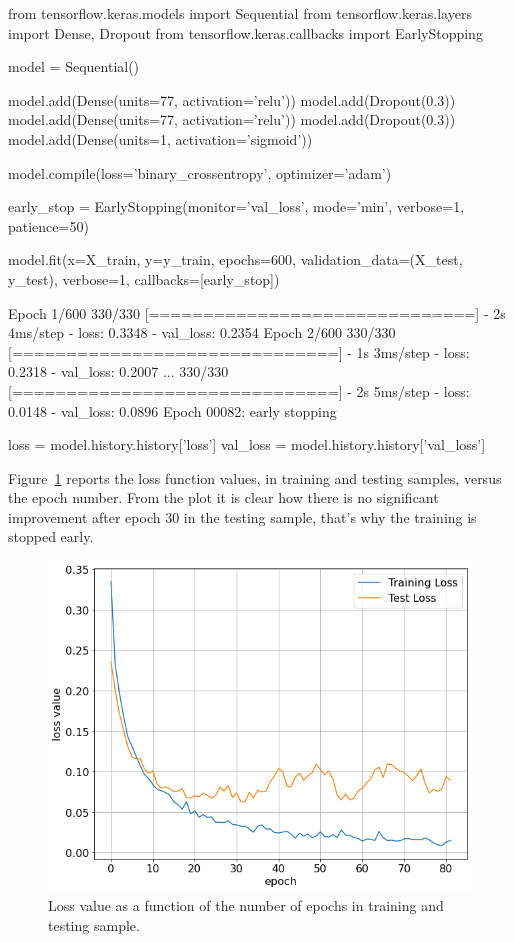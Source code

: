 \begin{ipython}
from tensorflow.keras.models import Sequential
from tensorflow.keras.layers import Dense, Dropout
from tensorflow.keras.callbacks import EarlyStopping

model = Sequential()

model.add(Dense(units=77, activation='relu'))
model.add(Dropout(0.3))
model.add(Dense(units=77, activation='relu'))
model.add(Dropout(0.3))
model.add(Dense(units=1, activation='sigmoid'))

model.compile(loss='binary_crossentropy', optimizer='adam')

early_stop = EarlyStopping(monitor='val_loss', 
                           mode='min', 
                           verbose=1, 
                           patience=50)

model.fit(x=X_train,
          y=y_train,
          epochs=600,
          validation_data=(X_test, y_test), 
          verbose=1,
          callbacks=[early_stop])
\end{ipython}
\begin{ioutput}
Epoch 1/600
330/330 [==============================] - 2s 4ms/step - loss: 0.3348 
- val_loss: 0.2354
Epoch 2/600
330/330 [==============================] - 1s 3ms/step - loss: 0.2318 
- val_loss: 0.2007
...
330/330 [==============================] - 2s 5ms/step - loss: 0.0148 
- val_loss: 0.0896
Epoch 00082: early stopping
\end{ioutput}

\begin{ipython}
loss = model.history.history['loss']
val_loss = model.history.history['val_loss']
\end{ipython}

Figure~\ref{fig:bankruptcy_loss} reports the loss function values, in training and testing samples, versus the epoch number. From the plot it is clear how there is no significant improvement after epoch 30 in the testing sample, that's why the training is stopped early.

\begin{figure}[htbp]
\centering
\includegraphics[width=0.7\linewidth]{figures/bankruptcy_loss}
\caption{Loss value as a function of the number of epochs in training and testing sample.}
\label{fig:bankruptcy_loss}
\end{figure}

